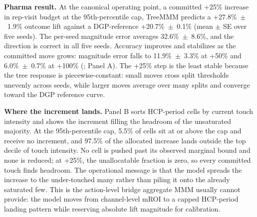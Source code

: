 \documentclass[review,12pt]{elsarticle}
\begin{document}
\textbf{Pharma result.} At the canonical operating point, a committed +25\%
increase in rep-visit budget at the 95th-percentile cap, TreeMMM predicts a
+27.8\%~$\pm$~1.9\% outcome lift against a DGP-reference
+20.7\%~$\pm$~0.1\% (mean $\pm$ SE over five seeds). The per-seed magnitude
error averages 32.6\%~$\pm$~8.6\%, and the direction is correct in all five
seeds. Accuracy improves and stabilizes as the committed move grows: magnitude
error falls to 11.9\%~$\pm$~3.3\% at +50\% and 6.0\%~$\pm$~0.7\% at +100\%
(;  Panel A). The +25\%
step is the least stable because the tree response is piecewise-constant:
small moves cross split thresholds unevenly across seeds, while larger moves
average over many splits and converge toward the DGP reference curve.

\begin{table}[ht]
\centering
\caption{Committed rep-visit budget increase on the pharma DGP
         (95th-percentile cap, $N{=}5$ seeds, mean $\pm$ SE).}
\label{tab:budget_landing}
\end{table}

\textbf{Where the increment lands.}  Panel B
sorts HCP-period cells by current touch intensity and shows the increment
filling the headroom of the unsaturated majority. At the 95th-percentile cap,
5.5\% of cells sit at or above the cap and receive no increment, and 97.5\%
of the allocated increase lands outside the top decile of touch intensity. No
cell is pushed past its observed marginal bound and none is reduced; at +25\%,
the unallocatable fraction is zero, so every committed touch finds headroom.
The operational message is that the model spreads the increase to the
under-touched many rather than piling it onto the already saturated few. This
is the action-level bridge aggregate MMM usually cannot provide: the model
moves from channel-level mROI to a capped HCP-period landing pattern while
reserving absolute lift magnitude for calibration.
\end{document}
